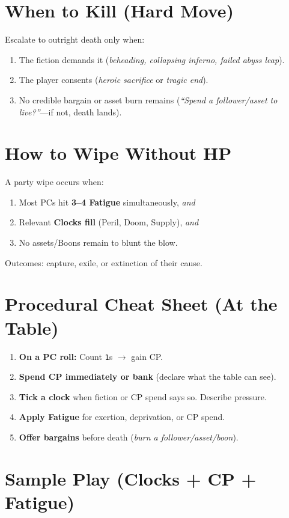 \documentclass[12pt]{book}
\begin{document}
\section{When to Kill (Hard Move)}
Escalate to outright death only when:
\begin{enumerate}
  \item The fiction demands it (\emph{beheading, collapsing inferno, failed abyss leap}).
  \item The player consents (\emph{heroic sacrifice} or \emph{tragic end}).
  \item No credible bargain or asset burn remains (\emph{``Spend a follower/asset to live?''}---if not, death lands).
\end{enumerate}

\section{How to Wipe Without HP}
A party wipe occurs when:
\begin{enumerate}
  \item Most PCs hit \textbf{3--4 Fatigue} simultaneously, \emph{and}
  \item Relevant \textbf{Clocks fill} (Peril, Doom, Supply), \emph{and}
  \item No assets/Boons remain to blunt the blow.
\end{enumerate}
Outcomes: capture, exile, or extinction of their cause.

\section{Procedural Cheat Sheet (At the Table)}
\begin{enumerate}
  \item \textbf{On a PC roll:} Count \texttt{1}s $\rightarrow$ gain CP.
  \item \textbf{Spend CP immediately or bank} (declare what the table can see).
  \item \textbf{Tick a clock} when fiction or CP spend says so. Describe pressure.
  \item \textbf{Apply Fatigue} for exertion, deprivation, or CP spend.
  \item \textbf{Offer bargains} before death (\emph{burn a follower/asset/boon}).
\end{enumerate}

\section{Sample Play (Clocks + CP + Fatigue)}
\end{document}
